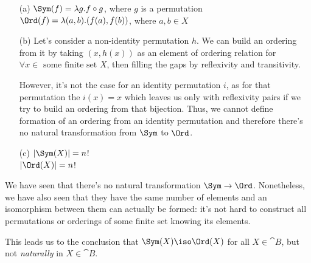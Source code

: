 \begin{answer}
  \begin{itemize}
    \item[(a)]
      $\Sym(f) = \lambda g.f \circ g$, where $g$ is a permutation\\
      $\Ord(f) = \lambda (a, b).(f(a), f(b))$, where $a, b \in X$
    \item[(b)]
      Let's consider a non-identity permutation $h$. We can build an ordering
      from it by taking $(x, h(x))$ as an element of ordering relation for
      $\forall x \in \text{ some finite set } X$, then filling the gaps by
      reflexivity and transitivity.

      However, it's not the case for an identity permutation $i$, as for that
      permutation the $i(x) = x$ which leaves us only with reflexivity pairs if
      we try to build an ordering from that bijection. Thus, we cannot define
      formation of an ordering from an identity permutation and therefore
      there's no natural transformation from $\Sym$ to $\Ord$.
    \item[(c)]
      $|\Sym(X)| = n$!\\
      $|\Ord(X)| = n$!
  \end{itemize}
  We have seen that there's no natural transformation $\Sym \to \Ord$.
  Nonetheless, we have also seen that they have the same number of
  elements and an isomorphism between them can actually be formed: it's not
  hard to construct all permutations or orderings of some finite set knowing
  its elements.

  This leads us to the conclusion that $\Sym(X) \iso \Ord(X)$ for all $X \in
  \cat{B}$, but not \emph{naturally} in $X \in \cat{B}$.
\end{answer}

